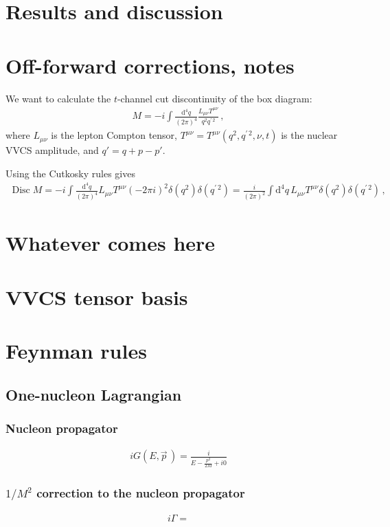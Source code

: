 \documentclass[prl,
twocolumn,
showpacs,preprintnumbers,amsmath,amssymb,
superscriptaddress,
a4paper,nofootinbib,longbibliography]{revtex4-2}
\DeclareMathOperator{\Disc}{Disc}
\begin{document}
\section{Results and discussion}

\section{Off-forward corrections, notes}
We want to calculate the $t$-channel cut discontinuity of the box diagram:
\begin{align}
    M=-i\int\frac{\mathrm{d}^4 q}{(2\pi)^4}\frac{L_{\mu\nu}T^{\mu\nu}}{q^2q^{\prime\,2}}\,,
\end{align}
where $L_{\mu\nu}$ is the lepton Compton tensor, $T^{\mu\nu} = T^{\mu\nu}(q^2,q^{\prime\,2},\nu,t)$
is the nuclear VVCS amplitude, and $q' = q + p - p'$.

Using the Cutkosky rules gives
\begin{align}
    \Disc M = -i\int\frac{\mathrm{d}^4 q}{(2\pi)^4}L_{\mu\nu}T^{\mu\nu}(-2\pi i)^2\delta(q^2)\delta(q^{\prime\,2})=\frac{i}{(2\pi)^2}\int\mathrm{d}^4 q\, L_{\mu\nu}T^{\mu\nu}\delta(q^2)\delta(q^{\prime\,2})\,,
\end{align}

\section{Whatever comes here}

\section{VVCS tensor basis}

\section{Feynman rules}
\subsection{One-nucleon Lagrangian}
\subsubsection{Nucleon propagator}
\begin{align}
    iG(E,\vec p\,) = \frac{i}{E-\frac{p^2}{2M}+i0}
\end{align}
\subsubsection{$1/M^2$ correction to the nucleon propagator}
\begin{align}
    i\Gamma = 
\end{align}
\end{document}

